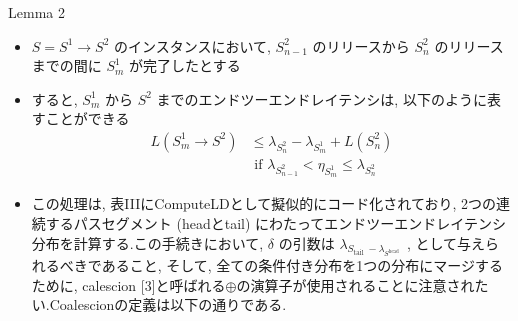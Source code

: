 \begin{frame}[label=lemma2]{Lemma 2}
    \begin{lemma}[]
        \begin{itemize}
            \item $S=S^{1} \rightarrow S^{2}$ のインスタンスにおいて, $S_{n-1}^{2}$ のリリースから $S_{n}^{2}$ のリリースまでの間に $S_{m}^{1}$ が完了したとする
            \item すると, $S_{m}^{1}$ から $S^{2}$ までのエンドツーエンドレイテンシは, 以下のように表すことができる
                  \begin{equation*}
                      \begin{aligned}
                          L\left(S_{m}^{1} \rightarrow S^{2}\right) & \leq \lambda_{S_{n}^{2}}-\lambda_{S_{m}^{1}}+L\left(S_{n}^{2}\right)         \\
                                                                    & \text { if } \lambda_{S_{n-1}^{2}}<\eta_{S_{m}^{1}} \leq \lambda_{S_{n}^{2}}
                      \end{aligned}
                  \end{equation*}
        \end{itemize}
    \end{lemma}
\end{frame}


\begin{frame}{}
    \begin{itemize}
        \item この処理は, 表IIIにComputeLDとして擬似的にコード化されており, 2つの連続するパスセグメント (headとtail) にわたってエンドツーエンドレイテンシ分布を計算する.この手続きにおいて, $\delta$ の引数は $\lambda_{S_{\text {tail }}-\lambda_{S^{\text {head }}}}$ , として与えられるべきであること, そして, 全ての条件付き分布を1つの分布にマージするために, calescion [3]と呼ばれる$\oplus$の演算子が使用されることに注意されたい.Coalescionの定義は以下の通りである.
    \end{itemize}
\end{frame}


